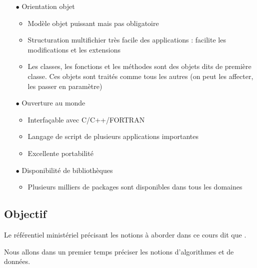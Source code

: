 \begin{itemize}
\begin{itemize}
			\end{itemize}
				\item [$\bullet$] Orientation objet
\begin{itemize}
	\item Modèle objet puissant mais pas obligatoire
\item  Structuration multifichier très facile des applications : facilite les modifications et les extensions
\item  Les classes, les fonctions et les méthodes sont des objets dits de première classe. Ces objets sont
traités comme tous les autres (on peut les affecter, les passer en paramètre)	\end{itemize}
\item [$\bullet$] Ouverture au monde
\begin{itemize}
	\item Interfaçable avec C/C++/FORTRAN
\item  Langage de script de plusieurs applications importantes
\item  Excellente portabilité	\end{itemize}
\item [$\bullet$] Disponibilité de bibliothèques
\begin{itemize}
	\item Plusieurs milliers de packages sont disponibles dans tous les domaines	\end{itemize}
				
				
					



\end{itemize}

\subsection{Objectif}
Le référentiel ministériel précisant les notions à aborder dans ce cours dit que 
.\fg\par

Nous allons dans un premier temps préciser les notions d'algorithmes et de données.\par


